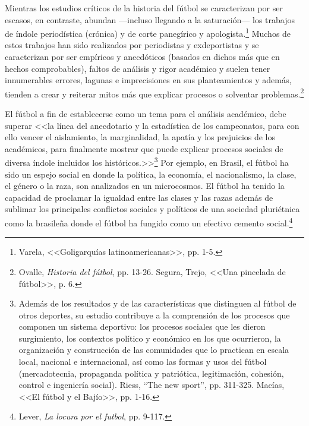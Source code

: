 \documentclass[11pt,a5paper,twoside]{book} %
\begin{document}
Mientras los estudios críticos de la historia del fútbol se caracterizan por ser escasos, en contraste, abundan ---incluso llegando a la saturación--- los trabajos de índole periodística (crónica) y de corte panegírico y apologista.\footnote{Varela, <<Goligarquías latinoamericanas>>, pp. 1-5.} Muchos de estos trabajos han sido realizados por periodistas y exdeportistas y se caracterizan por ser empíricos y anecdóticos (basados en dichos más que en hechos comprobables), faltos de análisis y rigor académico y suelen tener
innumerables errores, lagunas e imprecisiones en sus planteamientos y además, tienden a
crear y reiterar mitos más que explicar procesos o solventar problemas.\footnote{Ovalle, \emph{Historia del fútbol}, pp. 13-26. Segura, Trejo, <<Una pincelada de fútbol>>, p. 6.}

El fútbol a fin de establecerse como un tema para el análisis académico, debe superar <<la línea del anecdotario y la estadística de los campeonatos, para con ello vencer el aislamiento, la marginalidad, la apatía y los prejuicios de los académicos, para finalmente mostrar que puede explicar procesos sociales de diversa índole incluidos los históricos.>>\footnote{Además de los resultados y de las características que distinguen al fútbol de otros deportes, su estudio contribuye a la comprensión de los procesos que componen un sistema deportivo: los procesos sociales que les dieron surgimiento, los contextos político y económico en los que ocurrieron, la organización y construcción de las comunidades que lo practican en escala local, nacional e internacional, así como las formas y usos del fútbol (mercadotecnia, propaganda política y patriótica, legitimación, cohesión, control e ingeniería social). Riess, ``The new sport'', pp. 311-325. Macías, <<El fútbol y el Bajío>>, pp. 1-16.} Por ejemplo, en Brasil, el fútbol ha sido un espejo social en donde la política, la economía, el nacionalismo, la clase, el género o la raza, son analizados en un microcosmos. El fútbol ha tenido la capacidad de proclamar la igualdad entre las clases y las razas además de sublimar los principales conflictos sociales y políticos de una sociedad pluriétnica como la brasileña donde el fútbol ha fungido como un efectivo cemento social.\footnote{Lever, \emph{La locura por el futbol}, pp. 9-117.}
\end{document}
